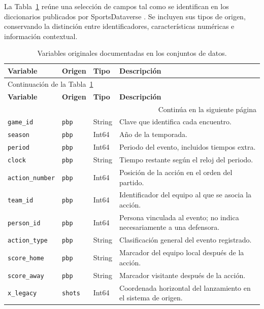La Tabla~\ref{tab:campos_wehoop} reúne una selección de campos tal como se identifican en los diccionarios publicados por SportsDataverse \cite{wehoopPbp,wehoopShots,wehoopLineups,wehoopPlayerSeason}. Se incluyen sus tipos de origen, conservando la distinción entre identificadores, características numéricas e información contextual.

{\small
\renewcommand{\arraystretch}{1.14}
\begin{longtable}{@{}p{3.2cm}p{3.2cm}p{1.65cm}p{4.9cm}@{}}
\caption{Variables originales documentadas en los conjuntos de datos.}\label{tab:campos_wehoop}\\
\toprule
\textbf{Variable} & \textbf{Origen} & \textbf{Tipo} & \textbf{Descripción}\\
\midrule
\endfirsthead
\multicolumn{4}{l}{\small Continuación de la Tabla~\ref{tab:campos_wehoop}}\\
\toprule
\textbf{Variable} & \textbf{Origen} & \textbf{Tipo} & \textbf{Descripción}\\
\midrule
\endhead
\midrule\multicolumn{4}{r}{\small Continúa en la siguiente página}\\\endfoot
\bottomrule\endlastfoot
\texttt{game\_id} & \texttt{pbp} & String & Clave que identifica cada encuentro.\\
\texttt{season} & \texttt{pbp} & Int64 & Año de la temporada.\\
\texttt{period} & \texttt{pbp} & Int64 & Periodo del evento, incluidos tiempos extra.\\
\texttt{clock} & \texttt{pbp} & String & Tiempo restante según el reloj del periodo.\\
\texttt{action\_number} & \texttt{pbp} & Int64 & Posición de la acción en el orden del partido.\\
\texttt{team\_id} & \texttt{pbp} & Int64 & Identificador del equipo al que se asocia la acción.\\
\texttt{person\_id} & \texttt{pbp} & Int64 & Persona vinculada al evento; no indica necesariamente a una defensora.\\
\texttt{action\_type} & \texttt{pbp} & String & Clasificación general del evento registrado.\\
\texttt{score\_home} & \texttt{pbp} & String & Marcador del equipo local después de la acción.\\
\texttt{score\_away} & \texttt{pbp} & String & Marcador visitante después de la acción.\\
\texttt{x\_legacy} & \texttt{shots} & Int64 & Coordenada horizontal del lanzamiento en el sistema de origen.\\

\end{longtable}}
